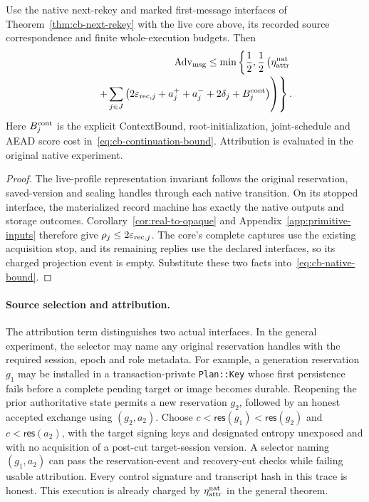 \begin{corollary}
\label{cor:live-core-next-rekey}
Use the native next-rekey and marked first-message interfaces of
Theorem~\ref{thm:cb-next-rekey} with the live core above, its recorded source
correspondence and finite whole-execution budgets. Then
\begin{equation}
\begin{split}
 \operatorname{Adv}_{\rm msg}\le\min\left\{\frac12,
 \frac12\left(\eta_{\rm attr}^{\rm nat}\right.\right.\\[-2pt]
 \left.\left.\qquad+
 \sum_{j\in J}\left(2\varepsilon_{{\rm rec},j}
      +a_j^++a_j^-+2\delta_j+B_j^{\rm cont}\right)
 \right)\right\}.
\end{split}
\label{eq:live-core-next-rekey}
\end{equation}
Here $B_j^{\rm cont}$ is the explicit ContextBound, root-initialization,
joint-schedule and AEAD score cost in~\eqref{eq:cb-continuation-bound}.
Attribution is evaluated in the original native experiment.
\end{corollary}
\begin{proof}
The live-profile representation invariant follows the original reservation,
saved-version and sealing handles through each native transition. On its
stopped interface, the materialized record machine has exactly the native
outputs and storage outcomes. Corollary~\ref{cor:real-to-opaque} and
Appendix~\ref{app:primitive-inputs} therefore give
$\rho_j\le2\varepsilon_{{\rm rec},j}$. The core's complete captures use
the existing acquisition stop, and its remaining replies use the declared
interfaces, so its charged projection event is empty. Substitute these two
facts into~\eqref{eq:cb-native-bound}.
\end{proof}

\paragraph{Source selection and attribution.}
The attribution term distinguishes two actual interfaces. In the general
experiment, the selector may name any original reservation handles with
the required session, epoch and role metadata. For example, a generation
reservation $g_1$ may be installed in a transaction-private
\texttt{Plan::Key} whose first persistence fails before a complete pending
target or image becomes durable. Reopening the prior
authoritative state permits a new reservation $g_2$, followed by an honest
accepted exchange using $(g_2,a_2)$. Choose
$c<\mathsf{res}(g_1)<\mathsf{res}(g_2)$ and
$c<\mathsf{res}(a_2)$, with the target signing keys and designated entropy
unexposed and with no acquisition of a post-cut target-session version.
A selector naming $(g_1,a_2)$ can pass
the reservation-event and recovery-cut checks while failing usable
attribution. Every control signature and transcript hash in this trace is
honest. This execution is already charged by
$\eta_{\rm attr}^{\rm nat}$ in the general theorem.

